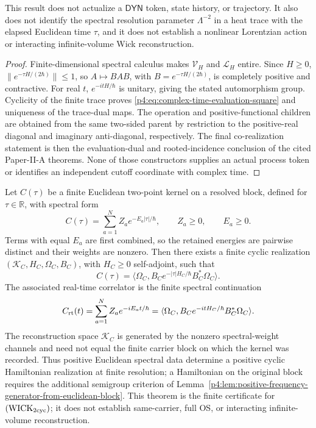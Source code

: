 \documentclass[12pt,a4paper]{article}
\begin{document}
\begin{theorem}
This result does not actualize a \(\mathsf{DYN}\) token, state history, or
trajectory.  It also does not identify the spectral resolution parameter
\(\Lambda^{-2}\) in a heat trace with the elapsed Euclidean time \(\tau\),
and it does not establish a nonlinear Lorentzian action or interacting
infinite-volume Wick reconstruction.
\end{theorem}

\begin{proof}
Finite-dimensional spectral calculus makes \(\mathcal V_H\) and
\(\mathcal L_H\) entire.  Since \(H\ge0\),
\(\|e^{-\tau H/(2\hbar)}\|\le1\), so
\(A\mapsto BAB\), with \(B=e^{-\tau H/(2\hbar)}\), is completely positive
and contractive.  For real \(t\), \(e^{-itH/\hbar}\) is unitary, giving the
stated automorphism group.  Cyclicity of the finite trace proves
\eqref{p4:eq:complex-time-evaluation-square} and uniqueness of the trace-dual
maps.  The operation and positive-functional children are obtained from the same
two-sided parent by restriction to the positive-real diagonal and imaginary
anti-diagonal, respectively.  The final co-realization statement is then the
evaluation-dual and rooted-incidence conclusion of the cited Paper-II-A
theorems.  None of those constructors supplies an actual process token or
identifies an independent cutoff coordinate with complex time.
\end{proof}

\begin{theorem}
\label{p4:thm:finite-euclidean-hamiltonian-reconstruction}
Let \(C(\tau)\) be a finite Euclidean two-point kernel on a resolved block, defined for \(\tau\in\mathbb R\), with spectral form
\[
C(\tau)=\sum_{a=1}^N Z_a e^{-E_a|\tau|/\hbar},
\qquad
Z_a\ge0,
\qquad
E_a\ge0.
\]
Terms with equal \(E_a\) are first combined, so the retained energies are
pairwise distinct and their weights are nonzero.
Then there exists a finite cyclic realization
\((\mathcal K_C,H_C,\Omega_C,B_C)\), with \(H_C\ge0\) self-adjoint, such that
\[
C(\tau)=
\langle\Omega_C,
B_C e^{-|\tau|H_C/\hbar}B_C^*\Omega_C\rangle.
\]
The associated real-time correlator is the finite spectral continuation
\[
C_{\rm rt}(t)=\sum_{a=1}^N Z_a e^{-iE_a t/\hbar}
=
\langle\Omega_C,
B_C e^{-itH_C/\hbar}B_C^*\Omega_C\rangle.
\]
The reconstruction space \(\mathcal K_C\) is generated by the nonzero
spectral-weight channels and need not equal the finite carrier block on
which the kernel was recorded.  Thus positive Euclidean spectral data
determine a positive cyclic Hamiltonian realization at finite resolution;
a Hamiltonian on the original block requires the additional semigroup
criterion of
Lemma~\ref{p4:lem:positive-frequency-generator-from-euclidean-block}.
This theorem is the finite certificate for
\((\mathrm{WICK}_{2{\rm cyc}})\); it does not establish same-carrier,
full OS, or interacting infinite-volume reconstruction.
\end{theorem}
\end{document}
